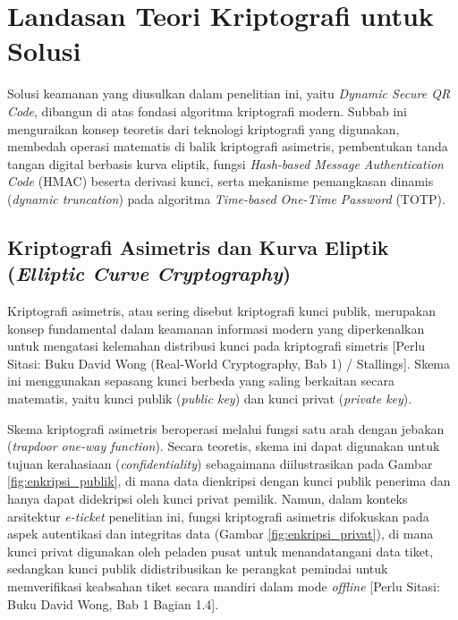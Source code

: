 \section{Landasan Teori Kriptografi untuk Solusi}
\label{sec:kriptografi}

Solusi keamanan yang diusulkan dalam penelitian ini, yaitu \textit{Dynamic Secure QR Code}, dibangun di atas fondasi algoritma kriptografi modern. Subbab ini menguraikan konsep teoretis dari teknologi kriptografi yang digunakan, membedah operasi matematis di balik kriptografi asimetris, pembentukan tanda tangan digital berbasis kurva eliptik, fungsi \textit{Hash-based Message Authentication Code} (HMAC) beserta derivasi kunci, serta mekanisme pemangkasan dinamis (\textit{dynamic truncation}) pada algoritma \textit{Time-based One-Time Password} (TOTP).

\subsection{Kriptografi Asimetris dan Kurva Eliptik (\textit{Elliptic Curve Cryptography})}
Kriptografi asimetris, atau sering disebut kriptografi kunci publik, merupakan konsep fundamental dalam keamanan informasi modern yang diperkenalkan untuk mengatasi kelemahan distribusi kunci pada kriptografi simetris [Perlu Sitasi: Buku David Wong (Real-World Cryptography, Bab 1) / Stallings]. Skema ini menggunakan sepasang kunci berbeda yang saling berkaitan secara matematis, yaitu kunci publik (\textit{public key}) dan kunci privat (\textit{private key}).

Skema kriptografi asimetris beroperasi melalui fungsi satu arah dengan jebakan (\textit{trapdoor one-way function}). Secara teoretis, skema ini dapat digunakan untuk tujuan kerahasiaan (\textit{confidentiality}) sebagaimana diilustrasikan pada Gambar \ref{fig:enkripsi_publik}, di mana data dienkripsi dengan kunci publik penerima dan hanya dapat didekripsi oleh kunci privat pemilik. Namun, dalam konteks arsitektur \textit{e-ticket} penelitian ini, fungsi kriptografi asimetris difokuskan pada aspek autentikasi dan integritas data (Gambar \ref{fig:enkripsi_privat}), di mana kunci privat digunakan oleh peladen pusat untuk menandatangani data tiket, sedangkan kunci publik didistribusikan ke perangkat pemindai untuk memverifikasi keabsahan tiket secara mandiri dalam mode \textit{offline} [Perlu Sitasi: Buku David Wong, Bab 1 Bagian 1.4].


